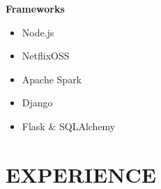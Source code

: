 \documentclass[overlapped]{res}
\begin{document}
\begin{resume}
\begin{multicols}{4}
        \textbf{Frameworks}
        \begin{itemize}
            \item Node.js
            \item NetflixOSS
            \item Apache Spark
            \item Django
            \item Flask \& SQLAlchemy
        \end{itemize}
    \end{multicols}

\section{EXPERIENCE}
\vspace{0.125in}


\end{resume}
\end{document}
